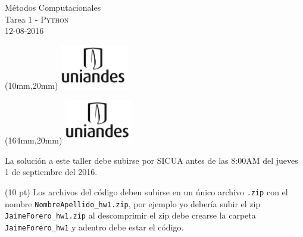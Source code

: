 \documentclass[11pt,letterpaper]{exam}
\begin{document}
\begin{center}
{\Large M\'etodos Computacionales} \\
Tarea 1 - \textsc{Python}\\
12-08-2016\\
\end{center}

\begin{textblock*}{40mm}(10mm,20mm)
  \includegraphics[width=3cm]{logoUniandes.png}
\end{textblock*}

\begin{textblock*}{40mm}(164mm,20mm)
  \includegraphics[width=3cm]{logoUniandes.png}
\end{textblock*}

\vspace{0.3cm}

\noindent
La solución a este taller debe subirse por SICUA antes de las 8:00AM
del jueves 1 de septiembre del 2016. 
\noindent

(10 pt) Los archivos del c\'odigo  deben subirse en un
\'unico archivo \verb".zip" con el nombre
\verb"NombreApellido_hw1.zip", por ejemplo yo deber\'ia subir el zip
\verb"JaimeForero_hw1.zip" al descomprimir el zip debe crearse la
carpeta \verb"JaimeForero_hw1" y adentro debe estar el c\'odigo.


\vspace{0.3cm}
\end{document}
